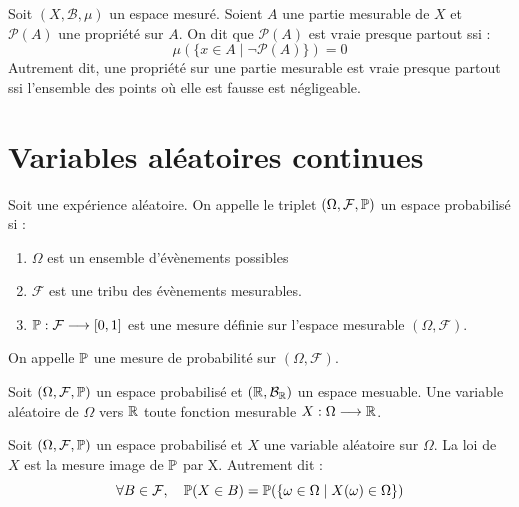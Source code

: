 \begin{definition}
    Soit $(X, \mathcal{B},\mu)$ un espace mesuré. Soient $A$ une partie mesurable de $X$ et $ \mathcal{P}(A)$ une propriété sur $A$. 
    On dit que $ \mathcal{P}(A)$ est vraie presque partout ssi :
        \[ \mu ( \{ x \in A \; | \; \lnot \mathcal{P}(A) \} ) = 0 \] 
    Autrement dit, une propriété sur une partie mesurable est vraie presque partout ssi l'ensemble des points où elle est fausse 
    est négligeable. 
\end{definition}


\section{Variables aléatoires continues}

\begin{definition}
    Soit une expérience aléatoire. On appelle le triplet $(\Omega, \mathcal{F}, \mathbb{P})$ un espace probabilisé si :
    \begin{enumerate}[label=\roman*)]
        \item $\Omega$ est un ensemble d'évènements possibles 
        \item $ \mathcal{F}$ est une tribu des évènements mesurables. 
        \item $\mathbb{P} : \mathcal{F} \longrightarrow [0,1]$ est une mesure définie sur l'espace mesurable $(\Omega, \mathcal{F})$. 
    \end{enumerate}
    On appelle $\mathbb{P}$ une mesure de probabilité sur $(\Omega, \mathcal{F})$. 
\end{definition}

\begin{definition}
    Soit $(\Omega, \mathcal{F}, \mathbb{P})$ un espace probabilisé et $(\mathbb{R}, \mathcal{B}_{\mathbb{R}})$ un espace mesuable. 
    Une variable aléatoire de $\Omega$ vers $\mathbb{R}$ toute fonction mesurable $X : \Omega \longrightarrow \mathbb{R}$.  
\end{definition}

\begin{definition}
    Soit $(\Omega, \mathcal{F},\mathbb{P})$ un espace probabilisé et $X$ une variable aléatoire sur $\Omega$. 
    La loi de $X$ est la mesure image de $ \mathbb{P}$ par X. Autrement dit :
        \[ \forall B \in \mathcal{F}, \quad \mathbb{P}(X \in B) = \mathbb{P}( \{ \omega \in \Omega \; | \; X(\omega) \in \Omega \} ) \] 
    
\end{definition}




















